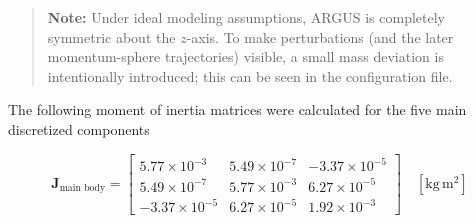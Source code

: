 \documentclass[conference,onecolumn,draftclsnofoot]{IEEEtran}
\begin{document}
\begin{quote}
\textbf{Note:} Under ideal modeling assumptions, ARGUS is completely symmetric about the $z$-axis. To make perturbations (and the later momentum-sphere trajectories) visible, a small mass deviation is intentionally introduced; this can be seen in the configuration file.
\end{quote}

The following moment of inertia matrices were calculated for the five main discretized components

\noindent
\begingroup
\small
\setlength{\abovedisplayskip}{4pt}
\setlength{\belowdisplayskip}{4pt}
\setlength{\abovedisplayshortskip}{4pt}
\setlength{\belowdisplayshortskip}{4pt}
\setlength{\arraycolsep}{3pt}
\renewcommand{\arraystretch}{0.95}

\begin{equation}
\mathbf{J}_{\text{main body}} =
\begin{bmatrix}
5.77\times10^{-3} & 5.49\times10^{-7} & -3.37\times10^{-5} \\
5.49\times10^{-7} & 5.77\times10^{-3} & 6.27\times10^{-5} \\
-3.37\times10^{-5} & 6.27\times10^{-5} & 1.92\times10^{-3}
\end{bmatrix}
\quad [\mathrm{kg\,m^2}]
\end{equation}
\end{document}
